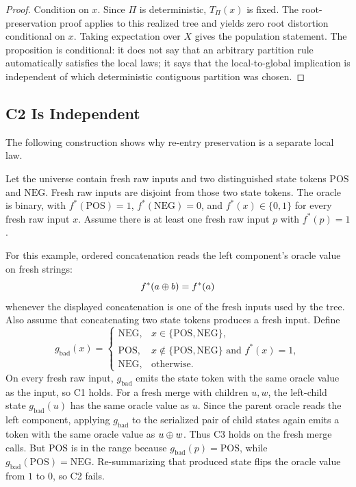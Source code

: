 \begin{proof}
Condition on \(x\). Since \(\Pi\) is deterministic, \(T_\Pi(x)\) is fixed.
The root-preservation proof applies to this realized tree and yields zero
root distortion conditional on \(x\). Taking expectation over \(X\) gives the
population statement. The proposition is conditional: it does not say that an
arbitrary partition rule automatically satisfies the local laws; it says that
the local-to-global implication is independent of which deterministic
contiguous partition was chosen.
\end{proof}

\subsection{C2 Is Independent}
\label{app:v8-c2-counterexample}

The following construction shows why re-entry preservation is a separate
local law.

\begin{example}
\label{ex:v8-c2-independent}
Let the universe contain fresh raw inputs and two distinguished state
tokens \(\mathrm{POS}\) and \(\mathrm{NEG}\). Fresh raw inputs are
disjoint from those two state tokens. The oracle is binary, with
\(f^\ast(\mathrm{POS})=1\), \(f^\ast(\mathrm{NEG})=0\), and
\(f^\ast(x)\in\{0,1\}\) for every fresh raw input \(x\). Assume there
is at least one fresh raw input \(p\) with \(f^\ast(p)=1\).

For this example, ordered concatenation reads the left component's
oracle value on fresh strings:
\[
  f^\ast(a\oplus b)=f^\ast(a)
\]
whenever the displayed concatenation is one of the fresh inputs used
by the tree. Also assume that concatenating two state tokens produces
a fresh input. Define
\[
g_{\mathrm{bad}}(x)=
\begin{cases}
\mathrm{NEG}, & x\in\{\mathrm{POS},\mathrm{NEG}\},\\
\mathrm{POS}, & x\notin\{\mathrm{POS},\mathrm{NEG}\}\text{ and }f^\ast(x)=1,\\
\mathrm{NEG}, & \text{otherwise.}
\end{cases}
\]
On every fresh raw input, \(g_{\mathrm{bad}}\) emits the state token
with the same oracle value as the input, so C1 holds. For a fresh
merge with children \(u,w\), the left-child state
\(g_{\mathrm{bad}}(u)\) has the same oracle value as \(u\). Since the
parent oracle reads the left component, applying \(g_{\mathrm{bad}}\)
to the serialized pair of child states again emits a token with the
same oracle value as \(u\oplus w\). Thus C3 holds on the fresh merge
calls. But \(\mathrm{POS}\) is in the range because
\(g_{\mathrm{bad}}(p)=\mathrm{POS}\), while
\(g_{\mathrm{bad}}(\mathrm{POS})=\mathrm{NEG}\). Re-summarizing that
produced state flips the oracle value from \(1\) to \(0\), so C2 fails.
\end{example}

